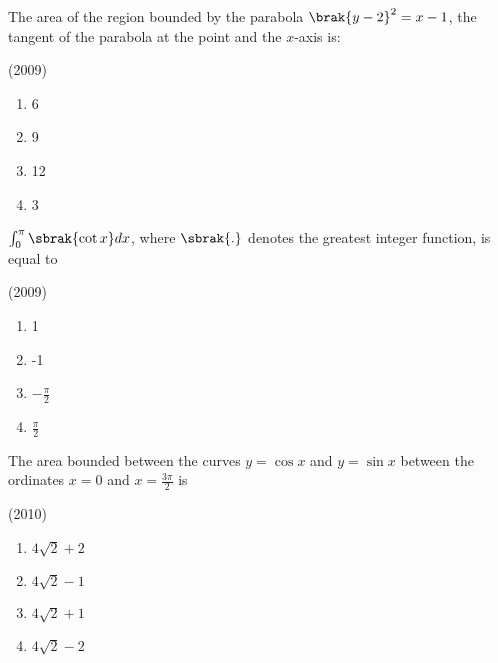 \iffalse
  \title{DEFINITE INTEGRALS}
  \author{BADDE VIJAYA SREYAS}
  \section{mains}
\fi


	 \item The area of the region bounded by the parabola $\brak{y-2}^2=x-1$, the tangent of the parabola at the point  and the $x$-axis is:

		\hfill{(2009)}

		\begin{multicols}{4}
			\begin{enumerate}
				\item 6
				\item 9
				\item 12
				\item 3
			\end{enumerate}
		\end{multicols}

	 \item $\int_0^\pi\sbrak{\cot x}dx$, where $\sbrak{.}$ denotes the greatest integer function, is equal to

		\hfill{(2009)}

		\begin{multicols}{4}
			\begin{enumerate}
				\item 1
				\item -1
				\item $-\frac{\pi}{2}$
				\item $\frac{\pi}{2}$
			\end{enumerate}
		\end{multicols}

	\item The area bounded between the curves $y=\cos x$ and $y=\sin x$ between the ordinates $x=0$ and $x=\frac{3\pi}{2}$ is

		\hfill{(2010)}

		\begin{multicols}{2}
			\begin{enumerate}
				\item $4\sqrt{2}+2$
				\item $4\sqrt{2}-1$
				\item $4\sqrt{2}+1$
				\item $4\sqrt{2}-2$
			\end{enumerate}
		\end{multicols}

